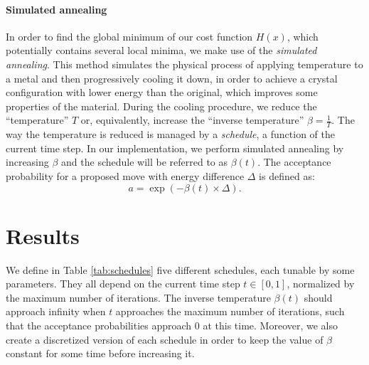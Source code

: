 \documentclass{article}
\begin{document}
  \paragraph{Simulated annealing}
  In order to find the global minimum of our cost function $H(x)$, which potentially contains several local minima, we make use of the \textit{simulated annealing}. This method simulates the physical process of applying temperature to a metal and then progressively cooling it down, in order to achieve a crystal configuration with lower energy than the original, which improves some properties of the material. During the cooling procedure, we reduce the ``temperature'' $T$ or, equivalently, increase the ``inverse temperature'' $\beta=\frac{1}{T}$. The way the temperature is reduced is managed by a \emph{schedule}, a function of the current time step. In our implementation, we perform simulated annealing by increasing $\beta$ and the schedule will be referred to as $\beta(t)$. The acceptance probability for a proposed move with energy difference $\Delta$ is defined as:
  \[
    a = \exp(- \beta(t) \times \Delta).
  \]

  \section*{Results}

  We define in Table \ref{tab:schedules} five different schedules, each tunable by some parameters. They all depend on the current time step $t \in [0, 1]$, normalized by the maximum number of iterations. The inverse temperature $\beta(t)$ should approach infinity when $t$ approaches the maximum number of iterations, such that the acceptance probabilities approach $0$ at this time. Moreover, we also create a discretized version of each schedule in order to keep the value of $\beta$ constant for some time before increasing it.
   
\end{document}
